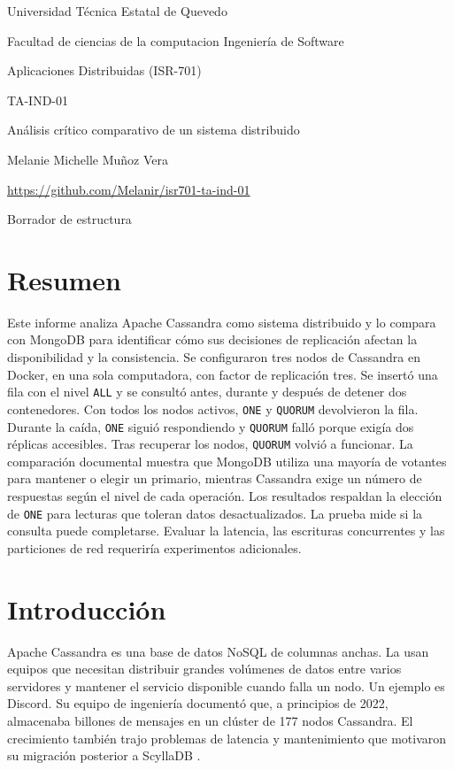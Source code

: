 \documentclass[11pt,a4paper]{article}
\begin{document}
\hypersetup{pageanchor=false}
\begin{titlepage}
  \centering
  {\Large Universidad Técnica Estatal de Quevedo\par}
  Facultad de ciencias de la computacion
  Ingeniería de Software\par
  Aplicaciones Distribuidas (ISR-701)\par
  \vfill
  {\Large TA-IND-01\par}
  {\LARGE Análisis crítico comparativo de un sistema distribuido\par}
  \vfill
  Melanie Michelle Muñoz Vera\par
  \url{https://github.com/Melanir/isr701-ta-ind-01}\par
  \vfill
  Borrador de estructura
\end{titlepage}
\hypersetup{pageanchor=true}

\section*{Resumen}
Este informe analiza Apache Cassandra como sistema distribuido y lo compara con MongoDB para identificar cómo sus decisiones de replicación afectan la disponibilidad y la consistencia. Se configuraron tres nodos de Cassandra en Docker, en una sola computadora, con factor de replicación tres. Se insertó una fila con el nivel \texttt{ALL} y se consultó antes, durante y después de detener dos contenedores. Con todos los nodos activos, \texttt{ONE} y \texttt{QUORUM} devolvieron la fila. Durante la caída, \texttt{ONE} siguió respondiendo y \texttt{QUORUM} falló porque exigía dos réplicas accesibles. Tras recuperar los nodos, \texttt{QUORUM} volvió a funcionar. La comparación documental muestra que MongoDB utiliza una mayoría de votantes para mantener o elegir un primario, mientras Cassandra exige un número de respuestas según el nivel de cada operación. Los resultados respaldan la elección de \texttt{ONE} para lecturas que toleran datos desactualizados. La prueba mide si la consulta puede completarse. Evaluar la latencia, las escrituras concurrentes y las particiones de red requeriría experimentos adicionales.

\section{Introducción}
Apache Cassandra es una base de datos NoSQL de columnas anchas. La usan equipos que necesitan distribuir grandes volúmenes de datos entre varios servidores y mantener el servicio disponible cuando falla un nodo. Un ejemplo es Discord. Su equipo de ingeniería documentó que, a principios de 2022, almacenaba billones de mensajes en un clúster de 177 nodos Cassandra. El crecimiento también trajo problemas de latencia y mantenimiento que motivaron su migración posterior a ScyllaDB \cite{cassandra5dynamo,ingram2023discord}.
\end{document}

